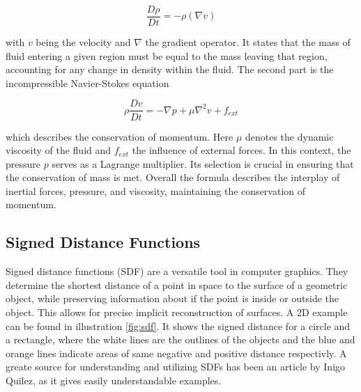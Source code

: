 \documentclass[intern]{cgMA}
\begin{document}
    \begin{equation}
        \frac{D \rho}{D t} = -\rho(\nabla v)
    \end{equation}

    with $v$ being the velocity and $\nabla$ the gradient operator. It states that the mass of fluid entering a given region must be equal to the mass leaving that region, accounting for any change in density within the fluid. The second part is the incompressible Navier-Stokes equation

    \begin{equation}
        \rho \frac{D v}{D t} = -\nabla p + \mu \nabla^2 v + f_{ext}
    \end{equation}

    which describes the conservation of momentum. Here $\mu$ denotes the dynamic viscosity of the fluid and $f_{ext}$ the influence of external forces. In this context, the pressure $p$ serves as a Lagrange multiplier. Its selection is crucial in ensuring that the conservation of mass is met. Overall the formula describes the interplay of inertial forces, pressure, and viscosity, maintaining the conservation of momentum.

    \subsection{Signed Distance Functions}
    Signed distance functions (SDF) are a versatile tool in computer graphics. They determine the shortest distance of a point in space to the surface of a geometric object, while preserving information about if the point is inside or outside the object. This allows for precise implicit reconstruction of surfaces. A 2D example can be found in illustration \ref{fig:sdf}. It shows the signed distance for a circle and a rectangle, where the white lines are the outlines of the objects and the blue and orange lines indicate areas of same negative and positive distance respectivly. A greate source for understanding and utilizing SDFs has been an article by Inigo Quilez, as it gives easily understandable examples. \cite{iquilezles}
\end{document}
